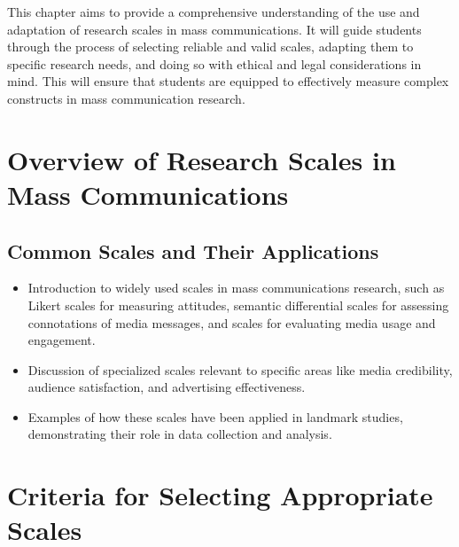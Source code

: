 \documentclass[
]{book}
\begin{document}
This chapter aims to provide a comprehensive understanding of the use and adaptation of research scales in mass communications. It will guide students through the process of selecting reliable and valid scales, adapting them to specific research needs, and doing so with ethical and legal considerations in mind. This will ensure that students are equipped to effectively measure complex constructs in mass communication research.

\hypertarget{overview-of-research-scales-in-mass-communications}{%
\section*{Overview of Research Scales in Mass Communications}\label{overview-of-research-scales-in-mass-communications}}

\hypertarget{common-scales-and-their-applications}{%
\subsection*{Common Scales and Their Applications}\label{common-scales-and-their-applications}}

\begin{itemize}
\item
  Introduction to widely used scales in mass communications research, such as Likert scales for measuring attitudes, semantic differential scales for assessing connotations of media messages, and scales for evaluating media usage and engagement.
\item
  Discussion of specialized scales relevant to specific areas like media credibility, audience satisfaction, and advertising effectiveness.
\item
  Examples of how these scales have been applied in landmark studies, demonstrating their role in data collection and analysis.
\end{itemize}

\hypertarget{criteria-for-selecting-appropriate-scales}{%
\section*{Criteria for Selecting Appropriate Scales}\label{criteria-for-selecting-appropriate-scales}}
\end{document}
